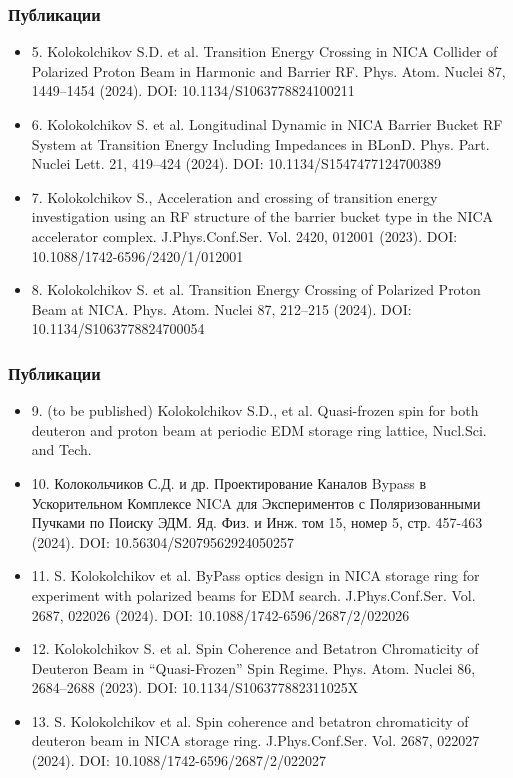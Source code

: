 \begin{frame}
	\frametitle{Публикации}
	\small
	\begin{itemize}
		\item	5. Kolokolchikov S.D. et al. Transition Energy Crossing in NICA Collider of Polarized Proton Beam in Harmonic and Barrier RF. Phys. Atom. Nuclei 87, 1449–1454 (2024). DOI: 10.1134/S1063778824100211
		\item	6. Kolokolchikov S. et al. Longitudinal Dynamic in NICA Barrier Bucket RF System at Transition Energy Including Impedances in BLonD. Phys. Part. Nuclei Lett. 21, 419–424 (2024). DOI: 10.1134/S1547477124700389
		\item	7. Kolokolchikov S., Acceleration and crossing of transition energy investigation using an RF structure of the barrier bucket type in the NICA accelerator complex. J.Phys.Conf.Ser. Vol. 2420, 012001 (2023). DOI: 10.1088/1742-6596/2420/1/012001
		\item	8. Kolokolchikov S. et al. Transition Energy Crossing of Polarized Proton Beam at NICA. Phys. Atom. Nuclei 87, 212–215 (2024). DOI: 10.1134/S1063778824700054
	\end{itemize}
\end{frame}
\begin{frame}
	\frametitle{Публикации}
	\small
	\begin{itemize}
		\item	9. (to be published) Kolokolchikov S.D., et al. Quasi-frozen spin for both deuteron and proton beam at periodic EDM storage ring lattice, Nucl.Sci. and Tech.
		\item	10. Колокольчиков С.Д. и др. Проектирование Каналов Bypass в Ускорительном Комплексе NICA для Экспериментов с Поляризованными Пучками по Поиску ЭДМ. Яд. Физ. и Инж. том 15, номер 5, стр. 457-463 (2024). DOI: 10.56304/S2079562924050257
		\item	11. S. Kolokolchikov et al. ByPass optics design in NICA storage ring for experiment with polarized beams for EDM search. J.Phys.Conf.Ser. Vol. 2687, 022026 (2024). DOI: 10.1088/1742-6596/2687/2/022026
		\item	12. Kolokolchikov S. et al. Spin Coherence and Betatron Chromaticity of Deuteron Beam in “Quasi-Frozen” Spin Regime. Phys. Atom. Nuclei 86, 2684–2688 (2023). DOI: 10.1134/S106377882311025X
		\item	13. S. Kolokolchikov et al. Spin coherence and betatron chromaticity of deuteron beam in NICA storage ring. J.Phys.Conf.Ser. Vol. 2687, 022027 (2024). DOI: 10.1088/1742-6596/2687/2/022027
	\end{itemize}
\end{frame}


